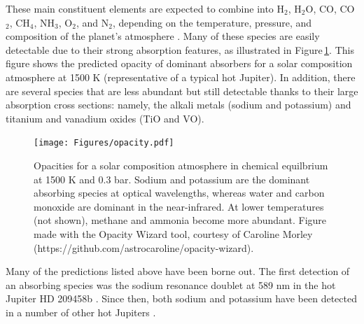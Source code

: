 \documentclass[graybox,natbib,nosecnum]{svmult}
\newcommand{\hbindex}[1]{\hl{#1}\index{#1}}  %
\begin{document}
These main constituent elements are expected to combine into H$_2$, H$_2$O, CO, CO$_2$, CH$_4$, NH$_3$, O$_2$, and N$_2$, depending on the temperature, pressure, and composition of the planet's atmosphere \citep{moses13}.  Many of these species are easily detectable due to their strong absorption features, as illustrated in Figure\,\ref{fig:opacity}.  This figure shows the predicted opacity of dominant absorbers for a solar composition atmosphere at 1500 K (representative of a typical hot Jupiter).  In addition, there are several species that are less abundant but still detectable thanks to their large absorption cross sections: namely, the alkali metals (sodium and potassium) and titanium and vanadium oxides (TiO and VO). 

\begin{figure}
\begin{centering}
\texttt{[image: Figures/opacity.pdf]}
\caption{Opacities for a solar composition atmosphere in chemical equilbrium at 1500 K and 0.3 bar. Sodium and potassium are the dominant absorbing species at optical wavelengths, whereas water and carbon monoxide are dominant in the near-infrared. At lower temperatures (not shown), methane and ammonia become more abundant. Figure made with the Opacity Wizard tool, courtesy of Caroline Morley (https://github.com/astrocaroline/opacity-wizard).}
\label{fig:opacity}       
\end{centering}
\end{figure}


Many of the predictions listed above have been borne out.  The first detection of an absorbing species was the sodium resonance doublet at 589 nm in the hot Jupiter HD 209458b \citep{charbonneau02}. Since then, both sodium and potassium have been detected in a number of other hot Jupiters \citep[e.g.][]{sing11b, nikolov14}. 
\end{document}

